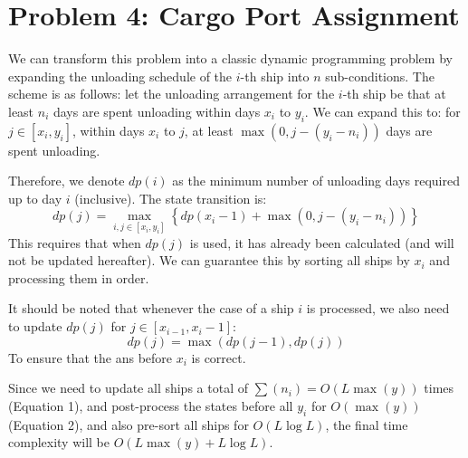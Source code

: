 \documentclass[11pt, a4paper, oneside]{memoir}
\begin{document}
\chapter{Problem 4: Cargo Port Assignment}
We can transform this problem into a classic dynamic programming problem by expanding the unloading schedule of the $i$-th ship into $n$ sub-conditions.
The scheme is as follows: let the unloading arrangement for the $i$-th ship be that at least $n_i$ days are spent unloading within days $x_i$ to $y_i$.
We can expand this to: for $j \in [x_i, y_i]$, within days $x_i$ to $j$, at least $\max \left(0, j-(y_i-n_i)\right)$ days are spent unloading.

Therefore, we denote $dp(i)$ as the minimum number of unloading days required up to day $i$ (inclusive).
The state transition is:
\[ dp(j) = \max_{i, j \in [x_i, y_i]} \left\{ dp(x_i-1) + \max \left(0, j-(y_i-n_i)\right) \right\} \]
This requires that when $dp(j)$ is used, it has already been calculated (and will not be updated hereafter).
We can guarantee this by sorting all ships by $x_i$ and processing them in order.

It should be noted that whenever the case of a ship $i$ is processed, we also need to update $dp(j)$ for $j \in [x_{i-1}, x_i-1]$:
\[ dp(j) = \max \left( dp(j-1), dp(j) \right) \]
To ensure that the ans before $x_{i}$ is correct.

Since we need to update all ships a total of $\sum(n_i) = O(L\max(y))$ times (Equation 1), and post-process the states before all $y_i$ for $O(\max(y))$ (Equation 2),
and also pre-sort all ships for $O(L\log L)$, the final time complexity will be $O(L\max(y) + L\log L)$.

\label{LastPage}
\end{document}
